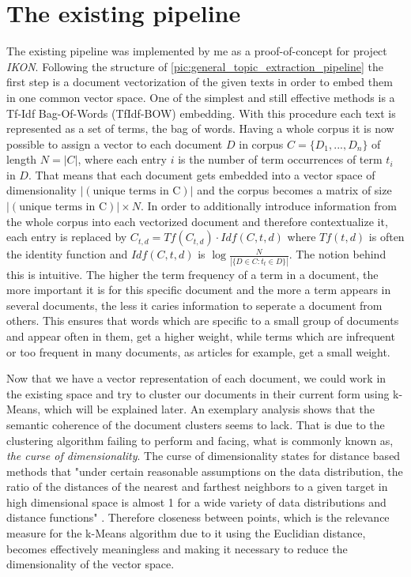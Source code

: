 \section{The existing pipeline}

The existing pipeline was implemented by me as a proof-of-concept for project \textit{IKON}. Following the structure of \autoref{pic:general_topic_extraction_pipeline} the first step is a document vectorization of the given texts in order to embed them in one common vector space. One of the simplest and still effective methods is a Tf-Idf Bag-Of-Words (TfIdf-BOW) embedding. With this procedure each text is represented as a set of terms, the bag of words. Having a whole corpus it is now possible to assign a vector to each document $D$ in corpus $C=\{D_1, ..., D_n\}$ of length $N = |C|$, where each entry $i$ is the number of term occurrences of term $t_i$ in $D$. That means that each document gets embedded into a vector space of dimensionality $|(\text{unique terms in C})|$ and the corpus becomes a matrix of size $|(\text{unique terms in C})| \times N$. In order to additionally introduce information from the whole corpus into each vectorized document and therefore contextualize it, each entry is replaced by $C_{t,d}=Tf(C_{t,d}) \cdot Idf(C,t,d)$ where $Tf(t,d)$ is often the identity function and $Idf(C,t,d)$ is $\log\frac{N}{|\{ D \in C : t_t \in D \}|}$. \cite{PivotedDocumentLength} The notion behind this is intuitive. The higher the term frequency of a term in a document, the more important it is for this specific document and the more a term appears in several documents, the less it caries information to seperate a document from others.  This ensures that words which are specific to a small group of documents and appear often in them, get a higher weight, while terms which are infrequent or too frequent in many documents, as articles for example, get a small weight.

Now that we have a vector representation of each document, we could work in the existing space and try to cluster our documents in their current form using k-Means, which will be explained later. An exemplary analysis shows that the semantic coherence of the document clusters seems to lack.  That is due to the clustering algorithm failing to perform and facing, what is commonly known as, \textit{the curse of dimensionality}. The curse of dimensionality states for distance based methods that "under certain reasonable assumptions on the
data distribution, the ratio of the distances of the nearest and farthest neighbors
to a given target in high dimensional space is almost 1 for a wide variety of data
distributions and distance functions" \cite{aggarwalSurprisingBehaviorDistance2001}. Therefore closeness between points, which is the relevance measure for the k-Means algorithm due to it using the Euclidian distance, becomes effectively meaningless and making it necessary to reduce the dimensionality of the vector space.

